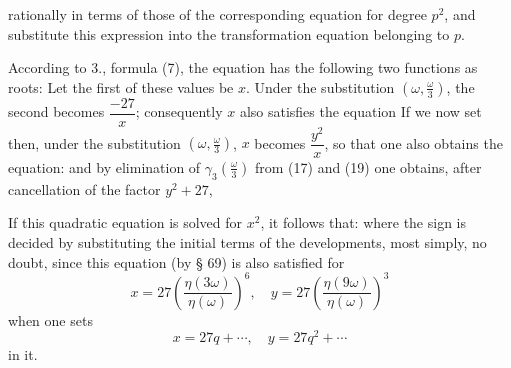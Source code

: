 rationally in terms of those of the corresponding equation for degree
$p^2$, and substitute this expression into the transformation equation
belonging to $p$.

According to 3., formula (7), the equation
has the following two functions as roots:
Let the first of these values be $x$. Under the substitution
$\left(\omega,\frac{\omega}{3}\right)$, the second becomes $\dfrac{-27}{x}$;
consequently $x$ also satisfies the equation
If we now set
then, under the substitution $\left(\omega,\frac{\omega}{3}\right)$,
$x$ becomes $\dfrac{y^2}{x}$, so that one also obtains the equation:
and by elimination of $\gamma_3\left(\frac{\omega}{3}\right)$ from
(17) and (19) one obtains, after cancellation of the factor $y^2+27$,

If this quadratic equation is solved for $x^2$, it follows that:
where the sign is decided by substituting the initial terms of the
developments, most simply, no doubt, since this equation (by § 69) is
also satisfied for
\[
x = 27\left(\frac{\eta(3\omega)}{\eta(\omega)}\right)^6, \quad y = 27\left(\frac{\eta(9\omega)}{\eta(\omega)}\right)^3
\]
when one sets
\[
x = 27q + \cdots, \quad y = 27q^2 + \cdots
\]
in it.
